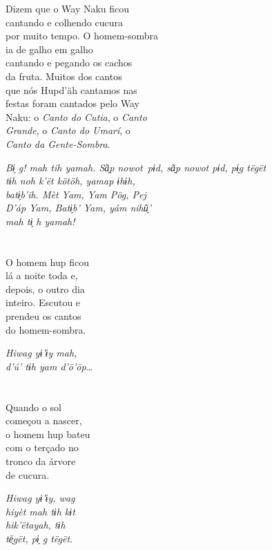 Dizem que o Way Naku ficou\\
cantando e colhendo cucura\\
por muito tempo. O homem-sombra\\
ia de galho em galho\\
cantando e pegando os cachos\\
da fruta. Muitos dos cantos\\
que nós Hupd’äh cantamos nas\\
festas foram cantados pelo Way\\
Naku: o \textit{Canto do Cutia}, o \textit{Canto\\
Grande}, o \textit{Canto do Umarí}, o\\
\textit{Canto da Gente-Sombra}.

\textit{Bɨ̗ g! mah tih yamah. Sã̗p nowot\
pɨd, sã̗p nowot pɨd, pɨ̗g tëgët\\
tɨh noh k’ët kötöh, yamap ɨhɨh,\\
batɨ̗b’ih. \textit{Mèt Yam}, \textit{Yam Pög}, \textit{Pej\\
D’áp Yam}, \textit{Batɨ̗b’ Yam}, yám nihũ̗’\\
mah tɨ̗ h yamah!}

\chapter{}

O homem hup ficou\\
lá a noite toda e,\\
depois, o outro dia\\
inteiro. Escutou e\\
prendeu os cantos\\
do homem-sombra.

\textit{Hiwag yɨ’ɨy mah,\\
d’ú’ tɨh yam d’ö’öp\ldots{}}

\chapter{}

Quando o sol\\
começou a nascer,\\
o homem hup bateu\\
com o terçado no\\
tronco da árvore\\
de cucura.

\textit{Hiwag yɨ’ɨy, wag\\
hiyèt mah tɨh kɨt\\
hik’ëtayah, tɨh\\
të̖gët, pɨ̗ g tëgët.}

